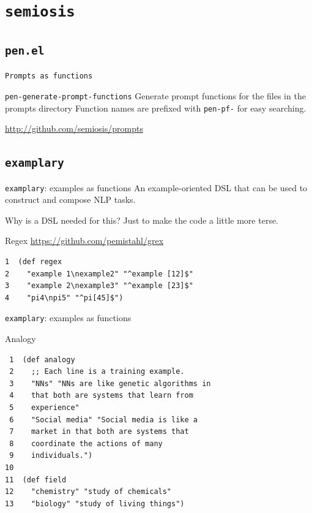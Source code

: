 \documentclass[presentation]{beamer}
\begin{document}
\section{\texttt{semiosis}}
\label{sec:org8a3738a}
\subsection{\texttt{pen.el}}
\label{sec:orgbc5ad3f}
\begin{frame}[label={sec:org41e8063},fragile]{\texttt{Prompts as functions}}
 \begin{block}{\texttt{pen-generate-prompt-functions}}
Generate prompt functions for the files in the
prompts directory Function names are prefixed
with \texttt{pen-pf-} for easy searching.

\url{http://github.com/semiosis/prompts}
\end{block}
\end{frame}

\subsection{\texttt{examplary}}
\label{sec:orgf098dc5}
\begin{frame}[label={sec:orged7c79d},fragile]{\texttt{examplary}: examples as functions}
 An example-oriented DSL that can be used to
construct and compose NLP tasks.

Why is a DSL needed for this? Just to make the
code a little more terse.

\begin{block}{Regex}
\url{https://github.com/pemistahl/grex}

{\footnotesize
\begin{verbatim}
1  (def regex
2    "example 1\nexample2" "^example [12]$"
3    "example 2\nexample3" "^example [23]$"
4    "pi4\npi5" "^pi[45]$")
\end{verbatim}
}
\end{block}
\end{frame}

\begin{frame}[label={sec:org7403a4c},fragile]{\texttt{examplary}: examples as functions}
 \begin{block}{Analogy}
{\footnotesize
\begin{verbatim}
 1  (def analogy
 2    ;; Each line is a training example.
 3    "NNs" "NNs are like genetic algorithms in
 4    that both are systems that learn from
 5    experience"
 6    "Social media" "Social media is like a
 7    market in that both are systems that
 8    coordinate the actions of many
 9    individuals.")
10  
11  (def field
12    "chemistry" "study of chemicals"
13    "biology" "study of living things")
\end{verbatim}
}
\end{block}
\end{frame}
\end{document}
